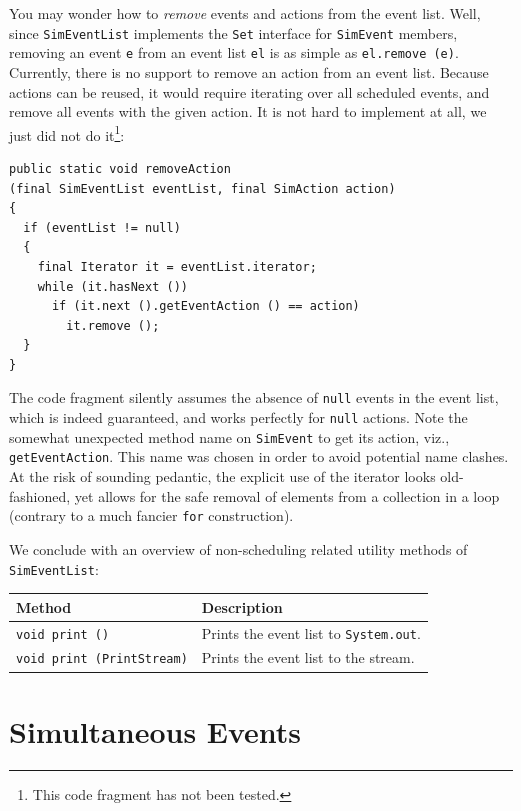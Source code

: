 \documentclass[12pt]{book}
\begin{document}
You may wonder how to {\em remove\/} events and actions from the event list.
Well, since \lstinline{SimEventList} implements the \lstinline{Set} interface for
  \lstinline{SimEvent} members, removing an event \lstinline{e}
  from an event list \lstinline{el} is as simple as
  \lstinline{el.remove (e)}.
Currently, there is no support to remove an action from an event list.
Because actions can be reused, it would require iterating over
  all scheduled events,
  and remove all events with the given action.
It is not hard to implement at all, we just did not do it\footnote{
This code fragment has not been tested.}:
\begin{lstlisting}[basicstyle=\tiny]
public static void removeAction
(final SimEventList eventList, final SimAction action)
{
  if (eventList != null)
  {
    final Iterator it = eventList.iterator;
    while (it.hasNext ())
      if (it.next ().getEventAction () == action)
        it.remove ();
  }
}
\end{lstlisting}
The code fragment silently assumes
  the absence of \lstinline{null} events
  in the event list,
  which is indeed guaranteed,
  and works perfectly for \lstinline{null} actions.
Note the somewhat unexpected method name on \lstinline{SimEvent}
  to get its action, viz., \lstinline{getEventAction}.
This name was chosen in order to avoid potential name clashes.
At the risk of sounding pedantic,
  the explicit use of the iterator
  looks old-fashioned,
  yet allows for
  the safe removal of elements
  from a collection in a loop
  (contrary to a much fancier \lstinline{for} construction).

We conclude with an overview of
  non-scheduling related utility methods
  of \lstinline{SimEventList}:

\begin{tabular}{|l|l|}
  \hline
  {\bf Method} & {\bf Description} \\
  \hline
  \lstinline[basicstyle=\footnotesize]!void print ()! & Prints the event list to \lstinline!System.out!. \\
  \lstinline[basicstyle=\footnotesize]!void print (PrintStream)! & Prints the event list to the stream. \\
  \hline
\end{tabular}

\section{Simultaneous Events}
\label{sec:events-eventlists-actions:simultaneous-events}
\end{document}
